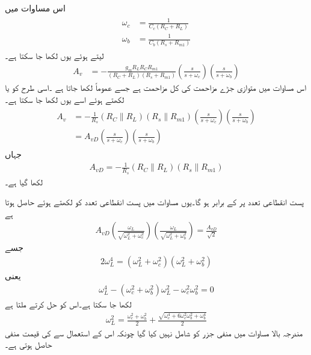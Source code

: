 اس مساوات میں
\begin{gather}
\begin{aligned}\label{مساوات_تعددی_ردعمل_قابو_محاصل_کپیسٹر_سادہ_مساوات}
\omega_c&=\frac{1}{C_c \left(R_C+R_L \right)}\\
\omega_b&=\frac{1}{C_b \left(R_s+R_{m1} \right)}
\end{aligned}
\end{gather}
لیتے ہوئے یوں لکھا جا سکتا ہے۔
\begin{align}
A_v&=-\frac{g_m R_L R_C R_{m1}}{\left(R_C+R_L \right)\left(R_s+R_{m1} \right)}\left(\frac{s}{s+\omega_c} \right)\left(\frac{s}{s+\omega_b} \right)
\end{align}
اس مساوات میں  متوازی جڑے مزاحمت کی کل مزاحمت ہے جسے عموماً  لکھا جاتا ہے ۔اسی طرح  کو  یا لکھتے ہوئے اسے یوں لکھا جا سکتا ہے۔
\begin{gather}
\begin{aligned}\label{مساوات_تعددی_ردعمل_قابو_محاصل_کپیسٹر}
A_v&=-\frac{1}{R_s} \left(\mathbin{R_C \| R_L} \right) \left( \mathbin{R_s \| R_{m1}}\right)\left(\frac{s}{s+\omega_c} \right)\left(\frac{s}{s+\omega_b} \right)\\
&=A_{vD}\left(\frac{s}{s+\omega_c} \right)\left(\frac{s}{s+\omega_b} \right)
\end{aligned}
\end{gather}
جہاں
\begin{align*}
A_{vD}=-\frac{1}{R_s} \left(\mathbin{R_C \| R_L} \right) \left( \mathbin{R_s \| R_{m1}}\right)
\end{align*}
لکھا گیا ہے۔

پست انقطاعی تعدد پر  کے برابر ہو گا۔یوں مساوات  میں پست انقطاعی تعدد کو  لکھتے ہوئے حاصل ہوتا ہے
\begin{align*}
A_{vD} \left(\frac{\omega_L}{\sqrt{\omega_L^2+\omega_c^2}} \right)\left(\frac{\omega_L}{\sqrt{\omega_L^2+\omega_b^2}} \right)=\frac{A_{vD}}{\sqrt{2}}
\end{align*}
جسے
\begin{align*}
2 \omega_L^4=\left(\omega_L^2+\omega_c^2 \right)\left(\omega_L^2+\omega_b^2\right)
\end{align*}
یعنی
\begin{align*}
\omega_L^4-\left(\omega_c^2+\omega_b^2 \right) \omega_L^2 -\omega_c^2 \omega_b^2=0
\end{align*}
لکھا جا سکتا ہے۔اس کو حل کرتے ملتا ہے
\begin{align}\label{مساوات_تعددی_ردعمل_قابو_محاصل_کپیسٹر_انقطاعی_تعدد}
\omega_L^2=\frac{\omega_c^2+\omega_b^2}{2}+\frac{\sqrt{\omega_c^4+6 \omega_c^2 \omega_b^2+\omega_b^4}}{2}
\end{align}
مندرجہ بالا مساوات میں منفی  جزر  کو شامل نہیں کیا گیا چونکہ اس کے استعمال سے  کی قیمت منفی حاصل ہوتی ہے۔

